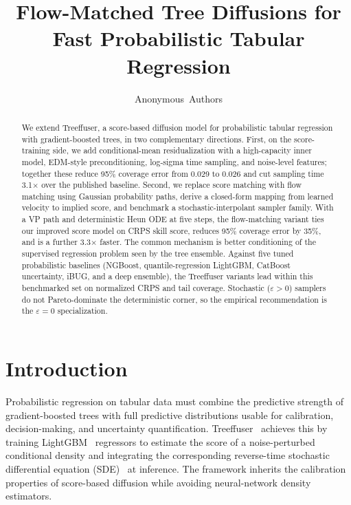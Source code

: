 \documentclass{uai2026}
\title{Flow-Matched Tree Diffusions for Fast Probabilistic Tabular Regression}
\author[1]{Anonymous~Authors}
\affil[1]{Anonymous Institution}
\begin{document}
\maketitle

\begin{abstract}
We extend Treeffuser, a score-based diffusion model for probabilistic tabular regression with gradient-boosted trees, in two complementary directions. First, on the score-training side, we add conditional-mean residualization with a high-capacity inner model, EDM-style preconditioning, log-sigma time sampling, and noise-level features; together these reduce 95\% coverage error from 0.029 to 0.026 and cut sampling time 3.1$\times$ over the published baseline. Second, we replace score matching with flow matching using Gaussian probability paths, derive a closed-form mapping from learned velocity to implied score, and benchmark a stochastic-interpolant sampler family. With a VP path and deterministic Heun ODE at five steps, the flow-matching variant ties our improved score model on CRPS skill score, reduces 95\% coverage error by 35\%, and is a further 3.3$\times$ faster. The common mechanism is better conditioning of the supervised regression problem seen by the tree ensemble. Against five tuned probabilistic baselines (NGBoost, quantile-regression LightGBM, CatBoost uncertainty, iBUG, and a deep ensemble), the Treeffuser variants lead within this benchmarked set on normalized CRPS and tail coverage. Stochastic ($\varepsilon > 0$) samplers do not Pareto-dominate the deterministic corner, so the empirical recommendation is the $\varepsilon = 0$ specialization.
\end{abstract}

\section{Introduction}\label{sec:intro}
Probabilistic regression on tabular data must combine the predictive strength of gradient-boosted trees with full predictive distributions usable for calibration, decision-making, and uncertainty quantification. Treeffuser~\citep{treeffuser} achieves this by training LightGBM~\citep{ke2017lightgbm} regressors to estimate the score of a noise-perturbed conditional density and integrating the corresponding reverse-time stochastic differential equation (SDE)~\citep{song2021score} at inference. The framework inherits the calibration properties of score-based diffusion while avoiding neural-network density estimators.
\end{document}
